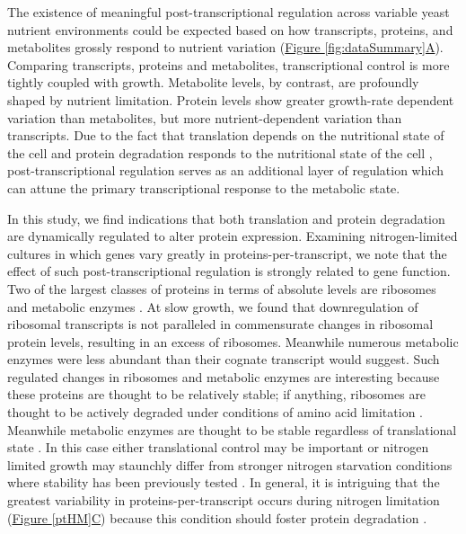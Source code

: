 The existence of meaningful post-transcriptional regulation across variable yeast nutrient environments could be expected based on how transcripts, proteins, and metabolites \cite{Boer:2010fb} grossly respond to nutrient variation (\hyperref[fig:dataSummary]{Figure \ref{fig:dataSummary}A}). Comparing transcripts, proteins and metabolites, transcriptional control is more tightly coupled with growth. Metabolite levels, by contrast, are profoundly shaped by nutrient limitation. Protein levels show greater growth-rate dependent variation than metabolites, but more nutrient-dependent variation than transcripts. Due to the fact that translation depends on the nutritional state of the cell \cite{Klumpp:2009ic} and protein degradation responds to the nutritional state of the cell \cite{Takeshige:1992wm}, post-transcriptional regulation serves as an additional layer of regulation which can attune the primary transcriptional response to the metabolic state.

In this study, we find indications that both translation and protein degradation are dynamically regulated to alter protein expression. Examining nitrogen-limited cultures in which genes vary greatly in proteins-per-transcript, we note that the effect of such post-transcriptional regulation is strongly related to gene function.  Two of the largest classes of proteins in terms of absolute levels are ribosomes and metabolic enzymes \cite{Ghaemmaghami:2003ds}. At slow growth, we found that downregulation of ribosomal transcripts is not paralleled in commensurate changes in ribosomal protein levels, resulting in an excess of ribosomes. Meanwhile numerous metabolic enzymes were less abundant than their cognate transcript would suggest. Such regulated changes in ribosomes and metabolic enzymes are interesting because these proteins are thought to be relatively stable; if anything, ribosomes are thought to be actively degraded under conditions of amino acid limitation \cite{Natarajan:2001ke, Washburn:2003ff, Zundel:2009dy}. Meanwhile metabolic enzymes are thought to be stable regardless of translational state \cite{Belle:2006hv}. In this case either translational control may be important or nitrogen limited growth may staunchly differ from stronger nitrogen starvation conditions where stability has been previously tested \cite{Natarajan:2001ke}. In general, it is intriguing that the greatest variability in proteins-per-transcript occurs during nitrogen limitation (\hyperref[ptHM]{Figure \ref{ptHM}C}) because this condition should foster protein degradation \cite{Zundel:2009dy, Xu:2013do}.

